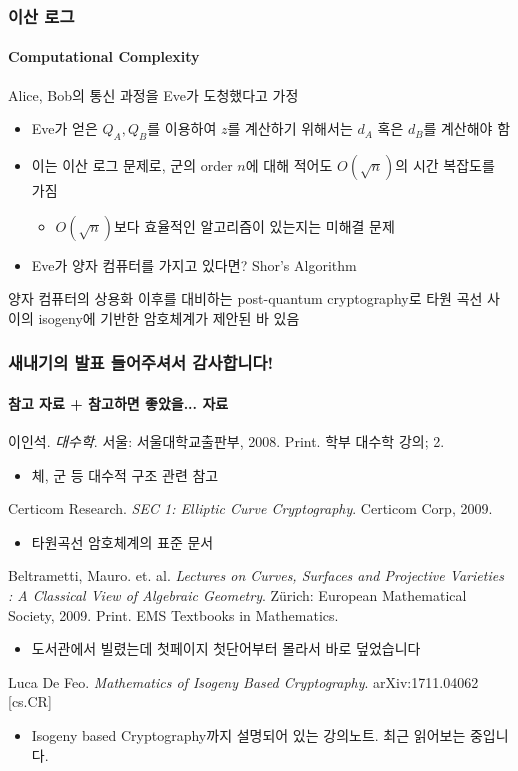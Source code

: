 \documentclass[aspectratio=169,mathserif]{beamer}
\begin{document}
  \begin{frame}
    \frametitle{이산 로그}
    \framesubtitle{Computational Complexity}

    Alice, Bob의 통신 과정을 Eve가 도청했다고 가정
    \pause
    \begin{itemize}
      \item Eve가 얻은 \(Q_A, Q_B\)를 이용하여 \(z\)를 계산하기 위해서는 \(d_A\) 혹은 \(d_B\)를 계산해야 함
      \item 이는 이산 로그 문제로, 군의 order \(n\)에 대해 적어도 \(O(\sqrt{n})\)의 시간 복잡도를 가짐
      \pause
      \begin{itemize}
        \item \(O(\sqrt{n})\)보다 효율적인 알고리즘이 있는지는 미해결 문제
      \end{itemize}
      \pause
      \item Eve가 양자 컴퓨터를 가지고 있다면? Shor's Algorithm
    \end{itemize}
    \pause
    양자 컴퓨터의 상용화 이후를 대비하는 post-quantum cryptography로 타원 곡선 사이의 isogeny에 기반한 암호체계가 제안된 바 있음
  \end{frame}

  \begin{frame}
    \frametitle{새내기의 발표 들어주셔서 감사합니다!}
    \framesubtitle{참고 자료 + 참고하면 좋았을... 자료}

    이인석. {\it 대수학}. 서울: 서울대학교출판부, 2008. Print. 학부 대수학 강의; 2.
    \begin{itemize}
      \item 체, 군 등 대수적 구조 관련 참고
    \end{itemize}
    Certicom Research. {\it SEC 1: Elliptic Curve Cryptography}. Certicom Corp, 2009.
    \begin{itemize}
      \item 타원곡선 암호체계의 표준 문서
    \end{itemize}
    Beltrametti, Mauro. et. al. {\it Lectures on Curves, Surfaces and Projective Varieties : A Classical View of Algebraic Geometry}. Zürich: European Mathematical Society, 2009. Print. EMS Textbooks in Mathematics.
    \begin{itemize}
      \item 도서관에서 빌렸는데 첫페이지 첫단어부터 몰라서 바로 덮었습니다
    \end{itemize}
    Luca De Feo. {\it Mathematics of Isogeny Based Cryptography}. arXiv:1711.04062 [cs.CR]
    \begin{itemize}
      \item Isogeny based Cryptography까지 설명되어 있는 강의노트. 최근 읽어보는 중입니다.
    \end{itemize}
  \end{frame}
\end{document}
